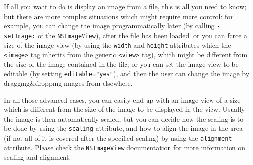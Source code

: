 If all you want to do is display an image from a file, this is all you
need to know; but there are more complex situations which might
require more control: for example, you can change the image
programmatically later (by calling \texttt{-setImage:} of the
\texttt{NSImageView}), after the file has been loaded; or you can
force a size of the image view (by using the \texttt{width} and
\texttt{height} attributes which the \texttt{<image>} tag inherits 
from the generic \texttt{<view>} tag), which might be different from
the size of the image contained in the file; or you can set the image
view to be editable (by setting \texttt{editable="yes"}), and then the
user can change the image by dragging\&dropping images from elsewhere.

In all those advanced cases, you can easily end up with an image view
of a size which is different from the size of the image to be
displayed in the view.  Usually the image is then automatically
scaled, but you can decide how the scaling is to be done by using the
\texttt{scaling} attribute, and how to align the image in the area (if
not all of it is covered after the specified scaling) by using the
\texttt{alignment} attribute.  Please check the \texttt{NSImageView} 
documentation for more information on scaling and alignment.

